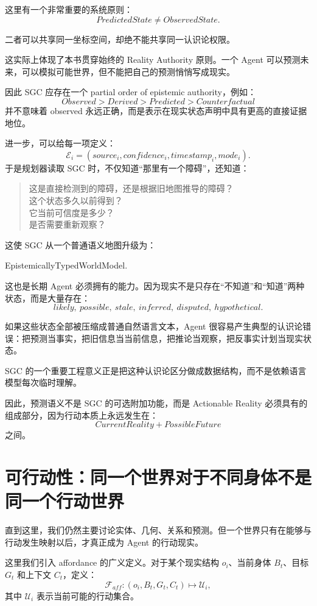 这里有一个非常重要的系统原则：
\[
\boxed{
PredictedState
\neq
ObservedState.
}
\]

二者可以共享同一坐标空间，却绝不能共享同一认识论权限。

这实际上体现了本书贯穿始终的 Reality Authority 原则。一个 Agent 可以预测未来，可以模拟可能世界，但不能把自己的预测悄悄写成现实。

因此 SGC 应存在一个 partial order of epistemic authority，例如：
\[
Observed
>
Derived
>
Predicted
>
Counterfactual
\]
并不意味着 observed 永远正确，而是表示在现实状态声明中具有更高的直接证据地位。

进一步，可以给每一项定义：
\[
\mathcal E_i
=
(
source_i,
confidence_i,
timestamp_i,
mode_i
).
\]
于是规划器读取 SGC 时，不仅知道“那里有一个障碍”，还知道：
\begin{quote}
这是直接检测到的障碍，还是根据旧地图推导的障碍？\\
这个状态多久以前得到？\\
它当前可信度是多少？\\
是否需要重新观察？
\end{quote}

这使 SGC 从一个普通语义地图升级为：
\begin{statementbox}
EpistemicallyTypedWorldModel.
\end{statementbox}

这也是长期 Agent 必须拥有的能力。因为现实不是只存在“不知道”和“知道”两种状态，而是大量存在：
\[
likely,\ possible,\ stale,\ inferred,\ disputed,\ hypothetical.
\]

如果这些状态全部被压缩成普通自然语言文本，Agent 很容易产生典型的认识论错误：把预测当事实，把旧信息当当前信息，把推论当观察，把反事实计划当现实状态。

SGC 的一个重要工程意义正是把这种认识论区分做成数据结构，而不是依赖语言模型每次临时理解。

因此，预测语义不是 SGC 的可选附加功能，而是 Actionable Reality 必须具有的组成部分，因为行动本质上永远发生在：
\[
CurrentReality
+
PossibleFuture
\]
之间。

\section{可行动性：同一个世界对于不同身体不是同一个行动世界}

直到这里，我们仍然主要讨论实体、几何、关系和预测。但一个世界只有在能够与行动发生映射以后，才真正成为 Agent 的行动现实。

这里我们引入 affordance 的广义定义。对于某个现实结构 \(o_i\)、当前身体 \(B_t\)、目标 \(G_t\) 和上下文 \(C_t\)，定义：
\[
\mathcal{F}_{aff}
:
(o_i,B_t,G_t,C_t)
\mapsto
\mathcal U_i,
\]
其中 \(\mathcal U_i\) 表示当前可能的行动集合。

